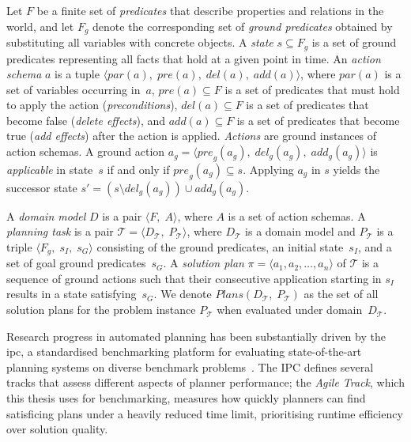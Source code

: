 Let $F$ be a finite set of \emph{predicates} that describe properties and relations in the world, and let $F_g$ denote the corresponding set of \emph{ground predicates} obtained by substituting all variables with concrete objects.
A \emph{state} $s \subseteq F_g$ is a set of ground predicates representing all facts that hold at a given point in time.
An \emph{action schema} $a$ is a tuple $\langle \mathit{par}(a),\; \mathit{pre}(a),\; \mathit{del}(a),\; \mathit{add}(a) \rangle$, where $\mathit{par}(a)$ is a set of variables occurring in~$a$, $\mathit{pre}(a) \subseteq F$ is a set of predicates that must hold to apply the action (\emph{preconditions}), $\mathit{del}(a) \subseteq F$ is a set of predicates that become false (\emph{delete effects}), and $\mathit{add}(a) \subseteq F$ is a set of predicates that become true (\emph{add effects}) after the action is applied.
\emph{Actions} are ground instances of action schemas.
A ground action $a_g = \langle \mathit{pre}_g(a_g),\; \mathit{del}_g(a_g),\; \mathit{add}_g(a_g) \rangle$ is \emph{applicable} in state~$s$ if and only if $\mathit{pre}_g(a_g) \subseteq s$.
Applying $a_g$ in $s$ yields the successor state $s' = (s \setminus \mathit{del}_g(a_g)) \cup \mathit{add}_g(a_g)$.

A \emph{domain model} $D$ is a pair $\langle F,\; A \rangle$, where $A$ is a set of action schemas.
A \emph{planning task} is a pair $\mathcal{T} = \langle D_{\mathcal{T}},\; P_{\mathcal{T}} \rangle$, where $D_{\mathcal{T}}$ is a domain model and $P_{\mathcal{T}}$ is a triple $\langle F_g,\; s_I,\; s_G \rangle$ consisting of the ground predicates, an initial state~$s_I$, and a set of goal ground predicates~$s_G$.
A \emph{solution plan} $\pi = \langle a_1, a_2, \ldots, a_n \rangle$ of $\mathcal{T}$ is a sequence of ground actions such that their consecutive application starting in $s_I$ results in a state satisfying~$s_G$.
We denote $\mathit{Plans}(D_{\mathcal{T}},\; P_{\mathcal{T}})$ as the set of all solution plans for the problem instance $P_{\mathcal{T}}$ when evaluated under domain~$D_{\mathcal{T}}$.

Research progress in automated planning has been substantially driven by the \gls{ipc}, a standardised benchmarking platform for evaluating state-of-the-art planning systems on diverse benchmark problems~\cite{GhallabNauTraverso2004, Vallati2015}.
The IPC defines several tracks that assess different aspects of planner performance; the \emph{Agile Track}, which this thesis uses for benchmarking, measures how quickly planners can find satisficing plans under a heavily reduced time limit, prioritising runtime efficiency over solution quality.

